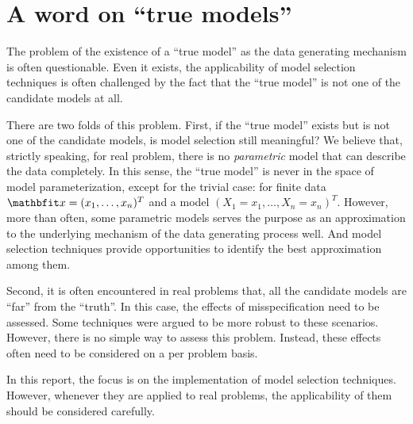 \section{A word on ``true models''}
\label{sec:A word on true models}

The problem of the existence of a ``true model'' as the data generating
mechanism is often questionable. Even it exists, the applicability of model
selection techniques is often challenged by the fact that the ``true model''
is not one of the candidate models at all.

There are two folds of this problem. First, if the ``true model'' exists but
is not one of the candidate models, is model selection still meaningful? We
believe that, strictly speaking, for real problem, there is no
\emph{parametric} model that can describe the data completely. In this sense,
the ``true model'' is never in the space of model parameterization, except for
the trivial case: for finite data $\bfx = (x_1,\dots,x_n)^T$ and a model $(X_1
= x_1,\dots,X_n = x_n)^T$. However, more than often, some parametric models
serves the purpose as an approximation to the underlying mechanism of the data
generating process well. And model selection techniques provide opportunities
to identify the best approximation among them.

Second, it is often encountered in real problems that, all the candidate
models are ``far'' from the ``truth''. In this case, the effects of
misspecification need to be assessed. Some techniques were argued to be more
robust to these scenarios.  However, there is no simple way to assess this
problem. Instead, these effects often need to be considered on a per problem
basis.

In this report, the focus is on the implementation of model selection
techniques. However, whenever they are applied to real problems, the
applicability of them should be considered carefully.
